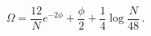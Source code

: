 \begin{equation}
\Omega = \frac{12}{N} e^{-2\phi} + \frac{\phi}{2} + \frac{1}{4} \log
\frac{N}{48}\, .
\end{equation}

